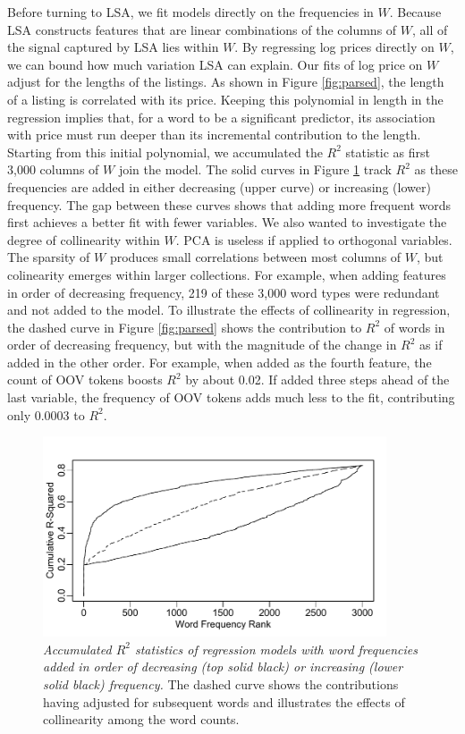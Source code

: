 \documentclass[12pt]{article}
\begin{document}
Before turning to LSA, we fit models directly on the frequencies in $W$.  Because LSA constructs features that are linear combinations of the columns of $W$, all of the signal captured by LSA lies within $W$.  By regressing log prices directly on $W$, we can bound how much variation LSA can explain.  Our fits of log price on $W$ adjust for the lengths of the listings.  As shown in Figure \ref{fig:parsed}, the length of a listing is correlated with its price.  Keeping this polynomial in length in the regression implies that, for a word to be a significant predictor, its association with price must run deeper than its incremental contribution to the length.  Starting from this initial polynomial, we accumulated the $R^2$ statistic as first 3,000 columns of $W$ join the model.  The solid curves in Figure \ref{fig:cumr2} track $R^2$ as these frequencies are added in either decreasing (upper curve) or increasing (lower) frequency.  The gap between these curves shows that adding more frequent words first achieves a better fit with fewer variables. We also wanted to investigate the degree of collinearity within $W$.  PCA is useless if applied to orthogonal variables. The sparsity of $W$ produces small correlations between most columns of $W$, but colinearity emerges within larger collections.  For example, when adding features in order of decreasing frequency, 219 of these 3,000 word types were redundant and not added to the model.  To illustrate the effects of collinearity in regression, the dashed curve in Figure \ref{fig:parsed} shows the contribution to $R^2$ of words in order of decreasing frequency, but with the magnitude of the change in $R^2$ as if added in the other order.  For example, when added as the fourth feature, the count of OOV tokens boosts $R^2$ by about 0.02.  If added three steps ahead of the last variable, the frequency of OOV tokens adds much less to the fit, contributing only 0.0003 to  $R^2$.  

\begin{figure}
\caption{  \label{fig:cumr2}  
  {\sl Accumulated $R^2$ statistics of regression models with word frequencies added in order of decreasing (top solid black) or increasing (lower solid black) frequency.} The dashed curve shows the contributions having adjusted for subsequent words and illustrates the effects of collinearity among the word counts.}  
  \centerline{ \includegraphics[width=4in]{figures/cumr2.pdf} }
\end{figure}
\end{document}
